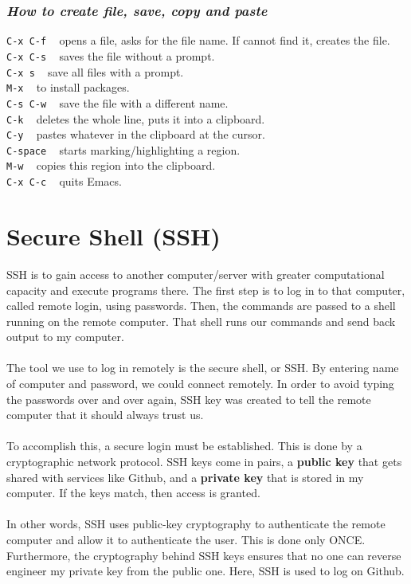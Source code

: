 \documentclass{article}
\begin{document}
{{{\subsubsection{\small\textsl{How to create file, save, copy and paste}}
\texttt{C-x C-f} ~ opens a file, asks for the file name. If cannot find it, creates the file.\\
\texttt{C-x C-s} ~ saves the file without a prompt.\\
\texttt{C-x s} ~ save all files with a prompt.\\
\texttt{M-x} ~ to install packages. \\
\texttt{C-s C-w} ~ save the file with a different name.\\
\texttt{C-k} ~ deletes the whole line, puts it into a clipboard.\\
\texttt{C-y} ~ pastes whatever in the clipboard at the cursor.\\
\texttt{C-space} ~ starts marking/highlighting a region.\\
\texttt{M-w} ~ copies this region into the clipboard.\\
\texttt{C-x C-c} ~ quits Emacs.\\

\newpage
\section{Secure Shell (SSH)}

SSH is to gain access to another computer/server with greater computational capacity and execute programs there. The first step is to log in to that computer, called remote login, using passwords. Then, the commands are passed to a shell running on the remote computer. That shell runs our commands and send back output to my computer. \\
\\
The tool we use to log in remotely is the secure shell, or SSH. By entering name of computer and password, we could connect remotely. In order to avoid typing the passwords over and over again, SSH key was created to tell the remote computer that it should always trust us. \\
\\
To accomplish this, a secure login must be established. This is done by a cryptographic network protocol. SSH keys come in pairs, a \textbf{public key} that gets shared with services like Github, and a \textbf{private key} that is stored in my computer. If the keys match, then access is granted. \\
\\
In other words, SSH uses public-key cryptography to authenticate  the remote computer and allow it to authenticate the user. This is done only ONCE. Furthermore, the cryptography behind SSH keys ensures that no one can reverse engineer my private key from the public one. Here, SSH is used to log on Github.\\


}}}
\end{document}
